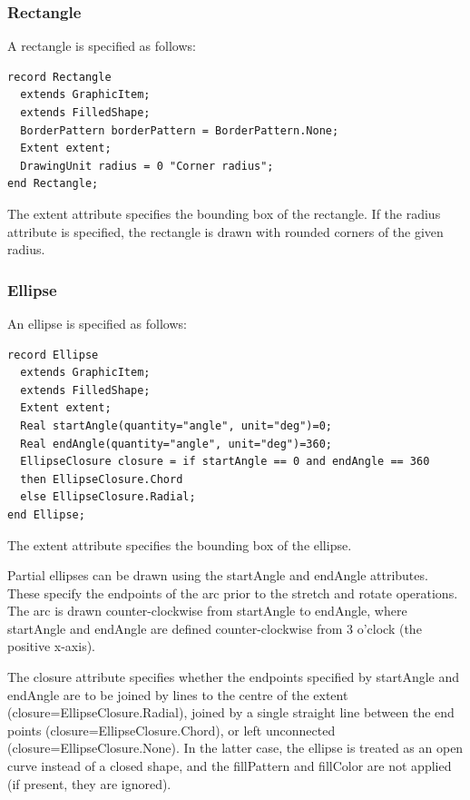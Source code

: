\documentclass[10pt,a4paper]{report}
\def\doublelabel#1{\label{#1}\hypertarget{#1}{}}
\begin{document}
\subsubsection{Rectangle}\doublelabel{rectangle}

A rectangle is specified as follows:

\begin{lstlisting}[language=modelica]
record Rectangle
  extends GraphicItem;
  extends FilledShape;
  BorderPattern borderPattern = BorderPattern.None;
  Extent extent;
  DrawingUnit radius = 0 "Corner radius";
end Rectangle;
\end{lstlisting}
The extent attribute specifies the bounding box of the rectangle. If the
radius attribute is specified, the rectangle is drawn with rounded
corners of the given radius.

\subsubsection{Ellipse}\doublelabel{ellipse}

An ellipse is specified as follows:

\begin{lstlisting}[language=modelica]
record Ellipse
  extends GraphicItem;
  extends FilledShape;
  Extent extent;
  Real startAngle(quantity="angle", unit="deg")=0;
  Real endAngle(quantity="angle", unit="deg")=360;
  EllipseClosure closure = if startAngle == 0 and endAngle == 360
  then EllipseClosure.Chord
  else EllipseClosure.Radial;
end Ellipse;
\end{lstlisting}
The extent attribute specifies the bounding box of the ellipse.

Partial ellipses can be drawn using the startAngle and endAngle
attributes. These specify the endpoints of the arc prior to the stretch
and rotate operations. The arc is drawn counter-clockwise from
startAngle to endAngle, where startAngle and endAngle are defined
counter-clockwise from 3 o'clock (the positive x-axis).

The closure attribute specifies whether the endpoints specified by
startAngle and endAngle are to be joined by lines to the centre of the
extent (closure=EllipseClosure.Radial), joined by a single straight line
between the end points (closure=EllipseClosure.Chord), or left
unconnected (closure=EllipseClosure.None). In the latter case, the
ellipse is treated as an open curve instead of a closed shape, and the
fillPattern and fillColor are not applied (if present, they are
ignored).
\end{document}
